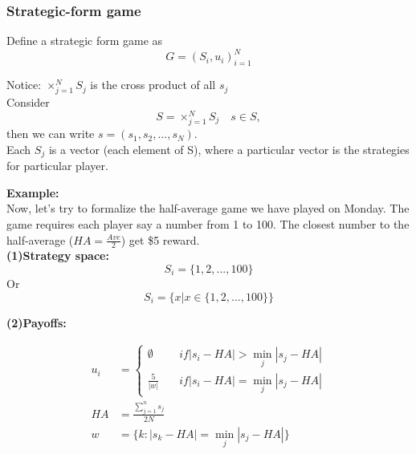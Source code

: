 \documentclass[12pt]{article}
\newcommand{\bb}[1]{{\textbf {#1}}}
\newcommand{\addup}[4]{\sum\limits_{#1 = #2} ^#3 {#4}}
\newcommand{\e}[1]{$ #1 $}
\newcommand{\ee}[1]{$$ #1 $$}
\begin{document}
\begin{spacing}{1.5}
                \subsubsection{Strategic-form game}
                    Define a strategic form game as
                    \ee{G = (S_i, u_i)_{i = 1}^N}
                    
                    Notice: \e{\times_{j = 1}^N S_j} is the cross product of all \e{s_j}\\

                    Consider
                    \ee{S = \times_{j = 1}^N S_j \quad s \in S,}
                    then we can write \e{s = (s_1,s_2,...,s_N)}.\\

                    Each \e{S_j} is a vector (each element of S), where a particular vector is the strategies for
                    particular player.

                    \bb{Example:}\\

                    Now, let's try to formalize the half-average game we have played on Monday. The game requires each
                    player say a number from 1 to 100. The closest number to the half-average (\e{HA = \frac{Ave}{2}})
                    get \$5 reward.\\

                    \bb{(1)Strategy space:}\\
                    \ee{S_i = \{ 1,2,...,100\}}
                    Or 
                    \ee{S_i = \{x| x \in \{1,2,...,100\}\} }

                    \bb{(2)Payoffs:}

                    
                    \begin{align*}
                        u_i &=
                        \begin{cases}
                            \emptyset \quad & if |s_i - HA| > \min_j |s_j - HA|\\
                            \frac{5}{|w|} \quad & if |s_i - HA| = \min_j |s_j - HA|
                        \end{cases}\\[5pt]
                        HA & = \frac{\addup{j}{1}{n}{s_j}}{2N}\\[5pt]
                        w & = \{k:|s_k - HA| = \min_j |s_j - HA|\}
                    \end{align*}


\end{spacing}
\end{document}
